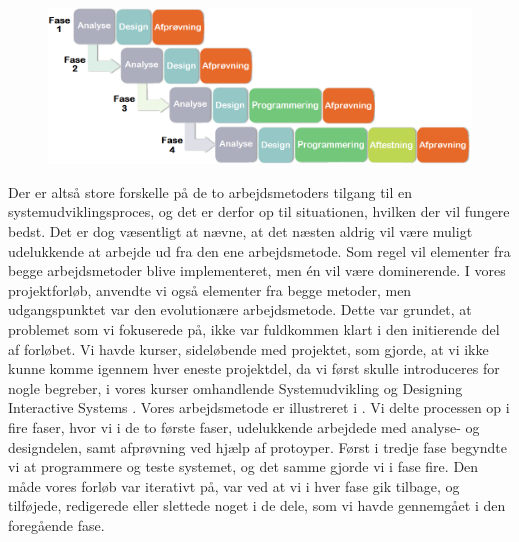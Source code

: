 \begin{figure}[ht]
	\centering
	\includegraphics[scale=0.5]{billeder/blandingsmetode.png}
  	\label{fig:blandingsmetode}
\end{figure}

Der er altså store forskelle på de to arbejdsmetoders tilgang til en systemudviklingsproces, og det er derfor op til situationen, hvilken der vil fungere bedst. Det er dog væsentligt at nævne, at det næsten aldrig vil være muligt udelukkende at arbejde ud fra den ene arbejdsmetode. Som regel vil elementer fra begge arbejdsmetoder blive implementeret, men én vil være dominerende. I vores projektforløb, anvendte vi også elementer fra begge metoder, men udgangspunktet var den evolutionære arbejdsmetode. Dette var grundet, at problemet som vi fokuserede på, ikke var fuldkommen klart i den initierende del af forløbet. Vi havde kurser, sideløbende med projektet, som gjorde, at vi ikke kunne komme igennem hver eneste projektdel, da vi først skulle introduceres for nogle begreber, i vores kurser omhandlende Systemudvikling \cite{ooad} og Designing Interactive Systems \cite{deb}. Vores arbejdsmetode er illustreret i . Vi delte processen op i fire faser, hvor vi i de to første faser, udelukkende arbejdede med analyse- og designdelen, samt afprøvning ved hjælp af protoyper. Først i tredje fase begyndte vi at programmere og teste systemet, og det samme gjorde vi i fase fire. Den måde vores forløb var iterativt på, var ved at vi i hver fase gik tilbage, og tilføjede, redigerede eller slettede noget i de dele, som vi havde gennemgået i den foregående fase.

